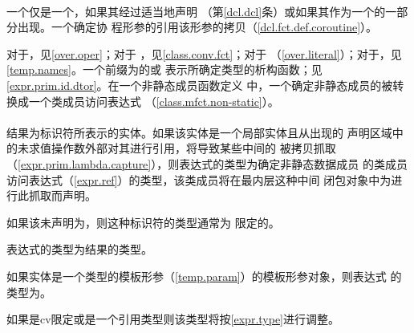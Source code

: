 
\paragraph{} %
一个仅是一个，如果其经过适当地声明
（第\ref{dcl.dcl}条）或如果其作为一个的一部分出现。一个确定协
程形参的引用该形参的拷贝（\ref{dcl.fct.def.coroutine}）。

\begin{note}
  对于，见\ref{over.oper}；对于
  ，见\ref{class.conv.fct}；对于
  （\ref{over.literal}）；对于，见
  \ref{temp.names}。一个前缀为\tm{\tat}的或
  表示所确定类型的析构函数；见\ref{expr.prim.id.dtor}。在一个非静态成员函数定义
  中，一个确定非静态成员的被转换成一个类成员访问表达式
  （\ref{class.mfct.non-static}）。
\end{note}

\paragraph{} %
结果为标识符所表示的实体。如果该实体是一个局部实体且从出现的
声明区域中的未求值操作数外部对其进行引用，将导致某些中间的
被拷贝抓取（\ref{expr.prim.lambda.capture}），则表达式的类型为确定非静态数据成员
的类成员访问表达式（\ref{expr.ref}）的类型，该类成员将在最内层这种中间
闭包对象中为进行此抓取而声明。

\begin{note}
  如果该未声明为，则这种标识符的类型通常为
  限定的。
\end{note}

表达式的类型为结果的类型。

\begin{note}
  如果实体是一个类型的模板形参（\ref{temp.param}）的模板形参对象，则表达式
  的类型为。
\end{note}

\begin{note}
  如果是cv限定或是一个引用类型则该类型将按\ref{expr.type}进行调整。
\end{note}

